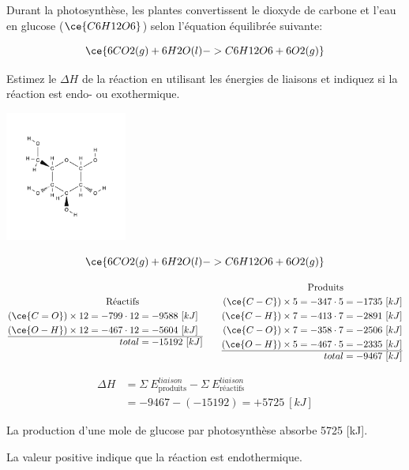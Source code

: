 \documentclass[
  11pt,
  french,
  a4paper,
  openany]{book}
\begin{document}
\begin{Exercise}

Durant la photosynthèse, les plantes convertissent le dioxyde de carbone et l'eau en glucose (\(\ce{C6H12O6}\)) selon l'équation équilibrée suivante:

\[
\ce{6 CO2(g) + 6 H2O(l) -> C6H12O6 + 6 O2(g)}
\]

Estimez le \(\Delta H\) de la réaction en utilisant les énergies de liaisons et indiquez si la réaction est endo- ou exothermique.



\end{Exercise}

\begin{Answer}
\includegraphics[width=0.3\textwidth,height=\textheight]{images/glucose.png}

\[
\ce{6 CO2(g) + 6 H2O(l) -> C6H12O6 + 6 O2(g)}
\]

\[
\begin{split}
  \text{Réactifs}& \\
  (\ce{C=O}) \times 12 = -799 \cdot 12 &= -9588\ [kJ] \\
  (\ce{O-H}) \times 12 = -467 \cdot 12 &= -5604\ [kJ] \\
  \hline
  total &= -15192\ [kJ]
\end{split}
\qquad
\begin{split}
  \text{Produits}& \\
  (\ce{C-C}) \times 5 = -347 \cdot 5 &= -1735\ [kJ] \\
  (\ce{C-H}) \times 7 = -413 \cdot 7 &= -2891\ [kJ] \\
  (\ce{C-O}) \times 7 = -358 \cdot 7 &= -2506\ [kJ] \\
  (\ce{O-H}) \times 5 = -467 \cdot 5 &= -2335\ [kJ] \\
  \hline
  total &= -9467\ [kJ]
\end{split}
\]

\[
\begin{split}
\Delta H &= \Sigma\ E^{liaison}_{\text{produits}} - \Sigma\ E^{liaison}_{\text{réactifs}} \\
  &= -9467 - (-15192) = +5725\ [kJ]
\end{split}
\]

La production d'une mole de glucose par photosynthèse absorbe 5725 {[}kJ{]}.

La valeur positive indique que la réaction est endothermique.

\end{Answer}
\end{document}
